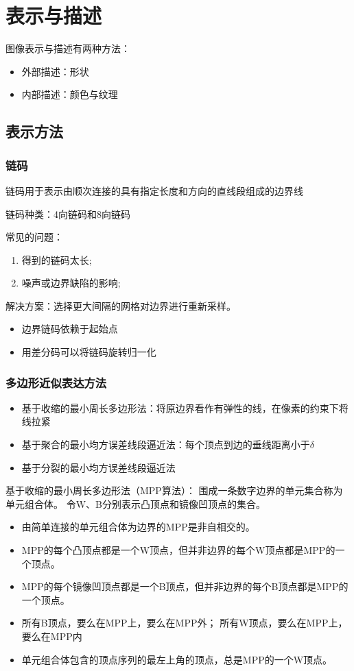 
\section{表示与描述} %
图像表示与描述有两种方法：
\begin{itemize}
	\item 外部描述：形状
	\item 内部描述：颜色与纹理
\end{itemize}

\subsection{表示方法}
\subsubsection{链码}
链码用于表示由顺次连接的具有指定长度和方向的直线段组成的边界线

链码种类：4向链码和8向链码

常见的问题：
\begin{enumerate}
\item 得到的链码太长;
\item 噪声或边界缺陷的影响;
\end{enumerate}

解决方案：选择更大间隔的网格对边界进行重新采样。
\begin{itemize}
\item 边界链码依赖于起始点
\item 用差分码可以将链码旋转归一化
\end{itemize}

\subsubsection{多边形近似表达方法}
\begin{itemize}
	\item 基于收缩的最小周长多边形法：将原边界看作有弹性的线，在像素的约束下将线拉紧
	\item 基于聚合的最小均方误差线段逼近法：每个顶点到边的垂线距离小于$\delta$
	\item 基于分裂的最小均方误差线段逼近法
\end{itemize}

基于收缩的最小周长多边形法（MPP算法）：
围成一条数字边界的单元集合称为单元组合体。
令W、B分别表示凸顶点和镜像凹顶点的集合。
\begin{itemize}
	\item 由简单连接的单元组合体为边界的MPP是非自相交的。
	\item MPP的每个凸顶点都是一个W顶点，但并非边界的每个W顶点都是MPP的一个顶点。
	\item MPP的每个镜像凹顶点都是一个B顶点，但并非边界的每个B顶点都是MPP的一个顶点。
	\item 所有B顶点，要么在MPP上，要么在MPP外；
	所有W顶点，要么在MPP上，要么在MPP内
	\item 单元组合体包含的顶点序列的最左上角的顶点，总是MPP的一个W顶点。
\end{itemize}

